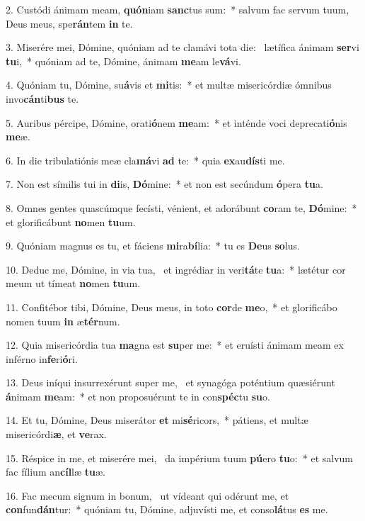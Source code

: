 2. Custódi ánimam meam, \textbf{quón}iam \textbf{sanc}tus sum:~*  salvum fac servum tuum, Deus meus, spe\textbf{rán}tem \textbf{in} te.\

3. Miserére mei, Dómine, quóniam ad te clamávi tota die: \dag\  lætífica ánimam \textbf{ser}vi \textbf{tu}i,~*  quóniam ad te, Dómine, ánimam \textbf{me}am le\textbf{vá}vi.\

4. Quóniam tu, Dómine, su\textbf{á}vis et \textbf{mi}tis:~*  et multæ misericórdiæ ómnibus invo\textbf{cán}ti\textbf{bus} te.\

5. Auribus pércipe, Dómine, orati\textbf{ó}nem \textbf{me}am:~*  et inténde voci deprecati\textbf{ó}nis \textbf{me}æ.\

6. In die tribulatiónis meæ cla\textbf{má}vi \textbf{ad} te:~*  quia \textbf{ex}au\textbf{dís}ti me.\

7. Non est símilis tui in \textbf{di}is, \textbf{Dó}mine:~*  et non est secúndum \textbf{ó}pera \textbf{tu}a.\

8. Omnes gentes quascúmque fecísti, vénient, et adorábunt \textbf{co}ram te, \textbf{Dó}mine:~*  et glorificábunt \textbf{no}men \textbf{tu}um.\

9. Quóniam magnus es tu, et fáciens \textbf{mi}ra\textbf{bí}lia:~*  tu es \textbf{De}us \textbf{so}lus.\

10. Deduc me, Dómine, in via tua, \dag\  et ingrédiar in veri\textbf{tá}te \textbf{tu}a:~*  lætétur cor meum ut tímeat \textbf{no}men \textbf{tu}um.\

11. Confitébor tibi, Dómine, Deus meus, in toto \textbf{cor}de \textbf{me}o,~*  et glorificábo nomen tuum \textbf{in} æ\textbf{tér}num.\

12. Quia misericórdia tua \textbf{ma}gna est \textbf{su}per me:~*  et eruísti ánimam meam ex inférno in\textbf{fe}ri\textbf{ó}ri.\

13. Deus iníqui insurrexérunt super me, \dag\  et synagóga poténtium quæsiérunt \textbf{á}nimam \textbf{me}am:~*  et non proposuérunt te in con\textbf{spéc}tu \textbf{su}o.\

14. Et tu, Dómine, Deus miserátor \textbf{et} mi\textbf{sé}ricors,~*  pátiens, et multæ misericórdi\textbf{æ}, et \textbf{ve}rax.\

15. Réspice in me, et miserére mei, \dag\  da impérium tuum \textbf{pú}ero \textbf{tu}o:~*  et salvum fac fílium an\textbf{cíl}læ \textbf{tu}æ.\

16. Fac mecum signum in bonum, \dag\  ut vídeant qui odérunt me, et \textbf{con}fun\textbf{dán}tur:~*  quóniam tu, Dómine, adjuvísti me, et conso\textbf{lá}tus \textbf{es} me.\

